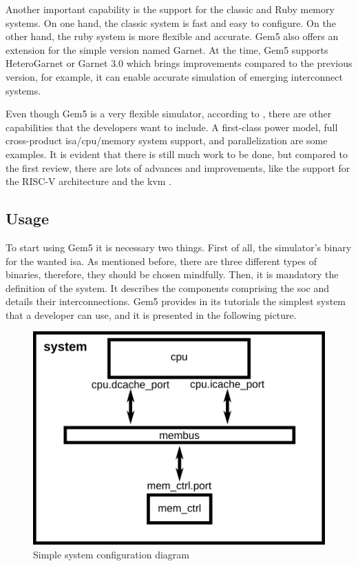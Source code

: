 Another important capability is the support for the classic and Ruby memory systems. On one 
hand, the classic system is fast and easy to configure. On the other hand, the ruby system is more flexible and accurate. Gem5 also offers an 
extension for the simple version named Garnet. At the time, Gem5 supports HeteroGarnet or Garnet 3.0 which brings improvements compared to the 
previous version, for example, it can enable accurate simulation of emerging interconnect systems. 


Even though Gem5 is a very flexible simulator, according to \cite{TheGem5Simulator}, there are other capabilities that the developers want to 
include. A first-class power model, full cross-product \gls{isa}/\gls{cpu}/memory system support, and parallelization are some examples. 
It is evident that there is still much work to be done, but compared to the first review, there are lots of advances and improvements, like 
the support for the RISC-V architecture and the \gls{kvm} \cite{Thegem5simulatorV2}. 



\subsection{Usage}

To start using Gem5 it is necessary two things. First of all, the simulator's binary for the wanted \gls{isa}. As mentioned before, 
there are three different types of binaries, therefore, they should be chosen mindfully. Then, it is mandatory the definition of the system. 
It describes the components comprising the \gls{soc} and details their interconnections. 
Gem5 provides in its tutorials the simplest system that a developer can use, and it is presented in the following picture.

\begin{figure}[H]
	\centering
 	\includegraphics[width=0.5\linewidth]{Images/simple_config.png}
 	\caption{Simple system configuration diagram}
	 \label{fig_simple_config}
\end{figure}

